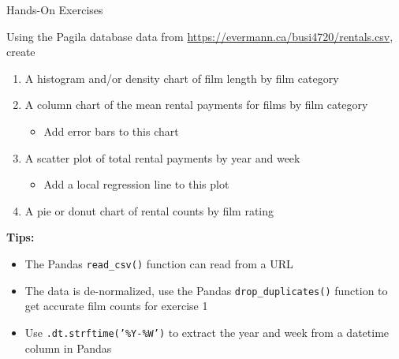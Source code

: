 \documentclass[ignorenonframetext,xcolor=x11names]{beamer}
\begin{document}
\begin{frame}{Hands-On Exercises}

\footnotesize
Using the Pagila database data from \url{https://evermann.ca/busi4720/rentals.csv}, create
\begin{enumerate}
   \item A histogram and/or density chart of film length by film category
   \item A column chart of the mean rental payments for films by film category
   \begin{itemize}
	  \footnotesize
      \item Add error bars to this chart
   \end{itemize}
   \item A scatter plot of total rental payments by year and week
   \begin{itemize}
	  \footnotesize
      \item Add a local regression line to this plot
   \end{itemize}
   \item A pie or donut chart of rental counts by film rating
\end{enumerate}
\textbf{Tips:}
\begin{itemize}
\item The Pandas \texttt{read\_csv()} function can read from a URL
\item The data is de-normalized, use the Pandas \texttt{drop\_duplicates()} function to get accurate film counts for exercise 1
\item Use \texttt{.dt.strftime('\%Y-\%W')} to extract the year and week from a datetime column in Pandas
\end{itemize}
\end{frame}
\end{document}
